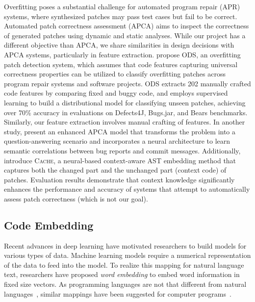 Overfitting poses a substantial challenge for automated program repair (APR) systems, where synthesized patches may pass test cases but fail to be correct. Automated patch correctness assessment (APCA) aims to inspect the correctness of generated patches using dynamic and static analyses. While our project has a different objective than APCA, we share similarities in design decisions with APCA systems, particularly in feature extraction. \cite{ye2021automated} propose ODS, an overfitting patch detection system, which assumes that code features capturing universal correctness properties can be utilized to classify overfitting patches across program repair systems and software projects. ODS extracts 202 manually crafted code features by comparing fixed and buggy code, and employs supervised learning to build a distributional model for classifying unseen patches, achieving over 70\% accuracy in evaluations on Defects4J, Bugs.jar, and Bears benchmarks. Similarly, our feature extraction involves manual crafting of features. In another study, \cite{tian2022change} present an enhanced APCA model that transforms the problem into a question-answering scenario and incorporates a neural architecture to learn semantic correlations between bug reports and commit messages. Additionally, \cite{lin2022context} introduce \textsc{Cache}, a neural-based context-aware AST embedding method that captures both the changed part and the unchanged part (context code) of patches. Evaluation results demonstrate that context knowledge significantly enhances the performance and accuracy of systems that attempt to automatically assess patch correctness (which is not our goal).


\subsection{Code Embedding}

Recent advances in deep learning have motivated researchers to build models for various types of data. Machine learning models require a numerical representation of the data to feed into the model. To realize this mapping for natural language text, researchers have proposed \emph{word embedding} to embed word information in fixed size vectors. As programming languages are not that different from natural languages~\citep{hindle2016naturalness}, similar mappings have been suggested for computer programs~\citep{chen2019literature}.

